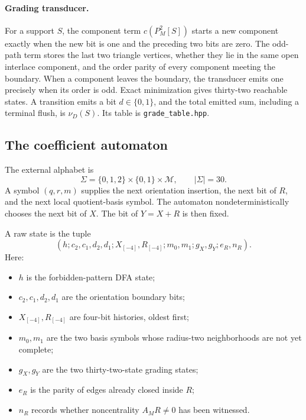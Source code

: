 \documentclass[10pt,letterpaper]{article}
\newcommand{\code}[1]{\nolinkurl{#1}}
\begin{document}
\paragraph{Grading transducer.}
For a support \(S\), the component term \(c(P_M^2[S])\) starts a new component exactly when the new bit is one and the preceding two bits are zero.  The odd-path term stores the last two triangle vertices, whether they lie in the same open interlace component, and the order parity of every component meeting the boundary.  When a component leaves the boundary, the transducer emits one precisely when its order is odd.  Exact minimization gives thirty-two reachable states.  A transition emits a bit \(d\in\{0,1\}\), and the total emitted sum, including a terminal flush, is \(\nu_D(S)\).  Its table is \code{grade_table.hpp}.

\subsection{The coefficient automaton}

The external alphabet is
\begin{equation}\label{eq:alphabet}
 \Sigma=\{0,1,2\}\times\{0,1\}\times\mathcal M,
 \qquad |\Sigma|=30.
\end{equation}
A symbol \((q,r,m)\) supplies the next orientation insertion, the next bit of \(R\), and the next local quotient-basis symbol.  The automaton nondeterministically chooses the next bit of \(X\).  The bit of \(Y=X+R\) is then fixed.

A raw state is the tuple
\begin{equation}\label{eq:raw-state}
 (h;c_2,c_1,d_2,d_1;X_{[-4]},R_{[-4]};m_0,m_1;g_X,g_Y;e_R,n_R).
\end{equation}
Here:
\begin{itemize}
\item \(h\) is the forbidden-pattern DFA state;
\item \(c_2,c_1,d_2,d_1\) are the orientation boundary bits;
\item \(X_{[-4]},R_{[-4]}\) are four-bit histories, oldest first;
\item \(m_0,m_1\) are the two basis symbols whose radius-two neighborhoods are not yet complete;
\item \(g_X,g_Y\) are the two thirty-two-state grading states;
\item \(e_R\) is the parity of edges already closed inside \(R\);
\item \(n_R\) records whether noncentrality \(A_MR\ne0\) has been witnessed.
\end{itemize}
\end{document}
